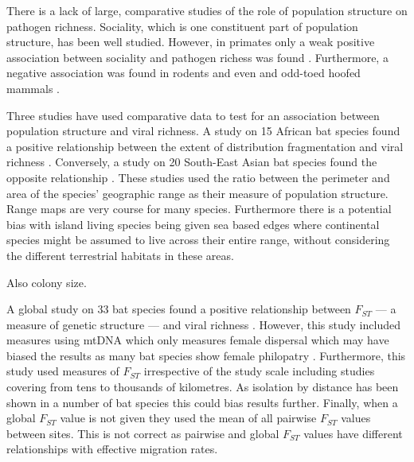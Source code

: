 

There is a lack of large, comparative studies of the role of population structure on pathogen richness.
Sociality, which is one constituent part of population structure, has been well studied.
However, in primates only a weak positive association between sociality and pathogen richess was found \cite{vitone2004body}.
Furthermore, a negative association was found in rodents \cite{bordes2007rodent} and even and odd-toed hoofed mammals \cite{ezenwa2006host}.









Three studies have used comparative data to test for an association between population structure and viral richness.
A study on 15 African bat species found a positive relationship between the extent of distribution fragmentation and viral richness \cite{maganga2014bat}.
Conversely, a study on 20 South-East Asian bat species found the opposite relationship \cite{gay2014parasite}. 
These studies used the ratio between the perimeter and area of the species' geographic range as their measure of population structure.
Range maps are very course for many species.
Furthermore there is a potential bias with island living species being given sea based edges where continental species might be assumed to live across their entire range, without considering the different terrestrial habitats in these areas.

Also colony size. \cite{bordes2008bat}

A global study on 33 bat species found a positive relationship between $F_{ST}$ --- a measure of genetic structure --- and viral richness \cite{turmelle2009correlates}. 
However, this study included measures using mtDNA which only measures female dispersal which may have biased the results as many bat species show female philopatry \cite{kerth2002extreme, hulva2010mechanisms}.
Furthermore, this study used measures of $F_{ST}$ irrespective of the study scale including studies covering from tens \cite{mccracken1981social} to thousands \cite{petit1999male} of kilometres.
As isolation by distance has been shown in a number of bat species \cite{burland1999population, hulva2010mechanisms, o2015genetic, vonhof2015range} this could bias results further.
Finally, when a global $F_{ST}$ value is not given they used the mean of all pairwise $F_{ST}$ values between sites.
This is not correct as pairwise and global $F_{ST}$ values have different relationships with effective migration rates. 

